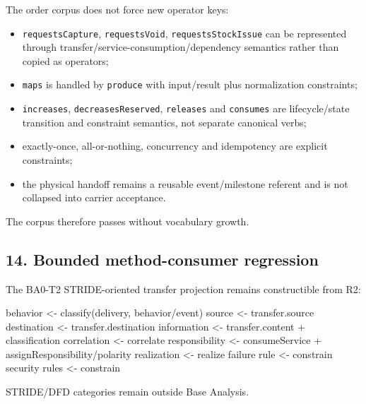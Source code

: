 \documentclass[
  10pt,
  a4paper,
]{article}
\newenvironment{Shaded}{}{}
\newcommand{\NormalTok}[1]{#1}
\providecommand{\tightlist}{%
  \setlength{\itemsep}{0pt}\setlength{\parskip}{0pt}}
\begin{document}
The order corpus does not force new operator keys:

\begin{itemize}
\tightlist
\item
  \texttt{requestsCapture}, \texttt{requestsVoid},
  \texttt{requestsStockIssue} can be represented through
  transfer/service-consumption/dependency semantics rather than copied
  as operators;
\item
  \texttt{maps} is handled by \texttt{produce} with input/result plus
  normalization constraints;
\item
  \texttt{increases}, \texttt{decreasesReserved}, \texttt{releases} and
  \texttt{consumes} are lifecycle/state transition and constraint
  semantics, not separate canonical verbs;
\item
  exactly-once, all-or-nothing, concurrency and idempotency are explicit
  constraints;
\item
  the physical handoff remains a reusable event/milestone referent and
  is not collapsed into carrier acceptance.
\end{itemize}

The corpus therefore passes without vocabulary growth.

\subsection{14. Bounded method-consumer
regression}\label{14-bounded-method-consumer-regression}

The BA0-T2 STRIDE-oriented transfer projection remains constructible
from R2:

\begin{Shaded}
\begin{Highlighting}[]
\NormalTok{behavior        \textless{}{-} classify(delivery, behavior/event)}
\NormalTok{source          \textless{}{-} transfer.source}
\NormalTok{destination     \textless{}{-} transfer.destination}
\NormalTok{information     \textless{}{-} transfer.content + classification}
\NormalTok{correlation     \textless{}{-} correlate}
\NormalTok{responsibility  \textless{}{-} consumeService + assignResponsibility/polarity}
\NormalTok{realization     \textless{}{-} realize}
\NormalTok{failure rule    \textless{}{-} constrain}
\NormalTok{security rules  \textless{}{-} constrain}
\end{Highlighting}
\end{Shaded}

STRIDE/DFD categories remain outside Base Analysis.
\end{document}
